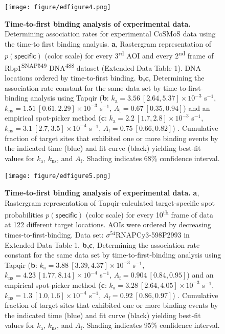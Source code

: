 \begin{figure}[t]
\centering
\texttt{[image: figure/edfigure4.png]}
\caption{\textbf{Time-to-first binding analysis of experimental data.}  Determining association rates for experimental CoSMoS data using the time-to first binding analysis. \textbf{a}, Rastergram representation of $p(\mathsf{specific})$ (color scale) for every 3\textsuperscript{rd} AOI and every 2\textsuperscript{nd} frame of Rbp1\textsuperscript{SNAP549}-DNA\textsuperscript{488} dataset (Extended Data Table 1). DNA locations ordered by time-to-first binding. \textbf{b,c}, Determining the association rate constant for the same data set by  time-to-first-binding analysis using Tapqir (\textbf{b}: $k_\mathrm{a} = 3.56 \: [2.64, 5.37] \times 10^{-3}$ s$^{-1}$, $k_\mathrm{ns} = 1.51 \: [0.61, 2.29] \times 10^{-3}$ s$^{-1}$, $A_\mathrm{f} = 0.67 \: [0.35, 0.94]$) and an empirical spot-picker method (\textbf{c}: $k_\mathrm{a} = 2.2 \: [1.7, 2.8] \times 10^{-3}$ s$^{-1}$, $k_\mathrm{ns} = 3.1 \: [2.7, 3.5] \times 10^{-4}$ s$^{-1}$, $A_\mathrm{f} = 0.75 \: [0.66, 0.82]$) \cite{Rosen2020-zn}.   Cumulative fraction of target sites that exhibited one or more binding events by the indicated time (blue) and fit curve (black) yielding best-fit values for $k_\mathrm{a}$, $k_\mathrm{ns}$, and $A_\mathrm{f}$. Shading indicates 68\% confidence interval.
}
\label{fig:rpb1snap549}
\end{figure}
\pagebreak

\begin{figure}[t]
\centering
\texttt{[image: figure/edfigure5.png]}
\caption{\textbf{Time-to-first binding analysis of experimental data.}  \textbf{a}, Rastergram representation of Tapqir-calculated target-specific spot  probabilities $p(\mathsf{specific})$ (color scale) for every 10\textsuperscript{th} frame of data at 122 different target locations.  AOIs were ordered by decreasing times-to-first-binding. Data set: $\sigma^{54}$RNAPCy3-598P2993 in Extended Data Table 1. \textbf{b,c}, Determining the association rate constant for the same data set by  time-to-first-binding analysis using Tapqir (\textbf{b}: $k_\mathrm{a} = 3.88 \: [3.39, 4.37] \times 10^{-3}$ s$^{-1}$, $k_\mathrm{ns} = 4.23 \: [1.77, 8.14] \times 10^{-4}$ s$^{-1}$, $A_\mathrm{f} = 0.904 \: [0.84, 0.95]$) and an empirical spot-picker method (\textbf{c}: $k_\mathrm{a} = 3.28 \: [2.64, 4.05] \times 10^{-3}$ s$^{-1}$, $k_\mathrm{ns} = 1.3 \: [1.0, 1.6] \times 10^{-4}$ s$^{-1}$, $A_\mathrm{f} = 0.92 \: [0.86, 0.97]$) \cite{Friedman2013-sf}. Cumulative fraction of target sites that exhibited one or more binding events by the indicated time (blue) and fit curve (black) yielding best-fit values for $k_\mathrm{a}$, $k_\mathrm{ns}$, and $A_\mathrm{f}$. Shading indicates 95\% confidence interval.
}
\label{fig:sigma54_298P2993}
\end{figure}
\clearpage
\pagebreak


